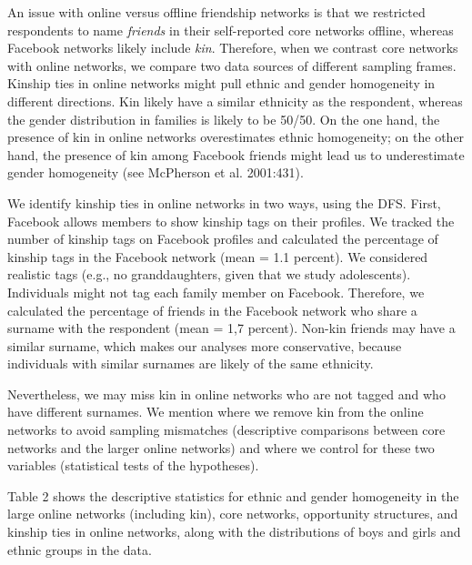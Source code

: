 \documentclass[letterpaper]{article} %
\begin{document}
An issue with online versus offline friendship
networks is that we restricted respondents to name \emph{friends} in their self-reported core networks offline, whereas Facebook networks likely include \emph{kin}. Therefore, when we contrast core networks with online networks, we compare two data sources of different sampling frames. Kinship ties in online networks might pull ethnic and gender homogeneity in different directions. Kin likely have a similar ethnicity as the respondent, whereas the gender distribution in families is likely to be 50/50. On the one hand, the presence of kin in online networks overestimates ethnic homogeneity; on the other hand, the presence of kin among Facebook friends might lead us to underestimate gender homogeneity (see McPherson et al. 2001:431).

We identify kinship ties in online networks in two ways, using the DFS. First, Facebook allows members to show kinship tags on their profiles. We tracked the number of kinship tags on Facebook profiles and calculated the percentage of kinship tags in the Facebook network (mean = 1.1 percent). We considered realistic tags (e.g., no granddaughters, given that we study adolescents). Individuals might not tag each family member on Facebook. Therefore, we calculated the percentage of friends in the Facebook network who share a surname with the respondent (mean = 1,7 percent). Non-kin friends may have a similar surname, which makes our analyses more conservative, because individuals with similar surnames are likely of the same ethnicity.

Nevertheless, we may miss kin in online networks
who are not tagged and who have different
surnames. We mention where we remove kin from the online networks to avoid sampling mismatches (descriptive comparisons between core networks and the larger online networks) and where we control for these two variables (statistical tests of the hypotheses).

Table 2 shows the descriptive statistics for ethnic and gender homogeneity in the large online networks (including kin), core networks,  opportunity structures, and kinship ties in online networks, along with the distributions of boys and girls and ethnic groups in the data.
\end{document}
